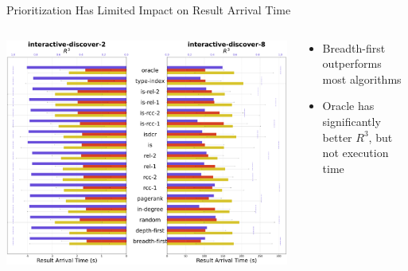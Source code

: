 \begin{frame}{Prioritization Has Limited Impact on Result Arrival Time}
    \begin{columns}[T] %
        \begin{column}{0.6\textwidth} %
            \includegraphics[width=\linewidth]{images/reduced-result-plot-presentation.pdf} %
        \end{column}

        \begin{column}{0.4\textwidth}
          \begin{itemize}
              \item Breadth-first outperforms most algorithms
              \item Oracle has significantly better $R^{3}$, but not execution time
          \end{itemize}
        \end{column}
    \end{columns}
\end{frame}



